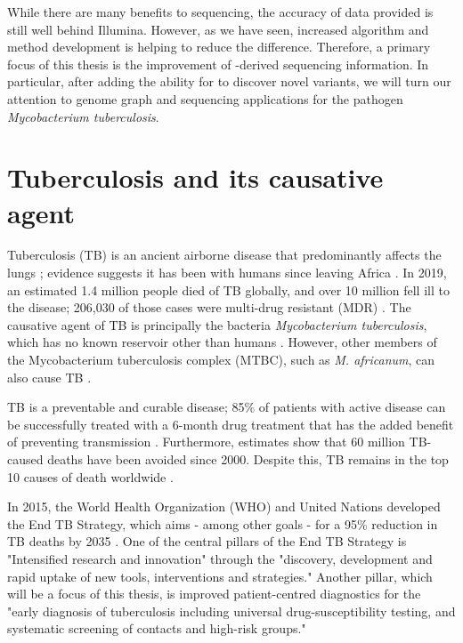 \hspace{0.75cm}

\noindent
While there are many benefits to \ont{} sequencing, the accuracy of data provided is still well behind Illumina. However, as we have seen, increased algorithm and method development is helping to reduce the difference. Therefore, a primary focus of this thesis is the improvement of \ont{}-derived sequencing information. In particular, after adding the ability for \pandora{} to discover novel variants, we will turn our attention to genome graph and \ont{} sequencing applications for the pathogen \textit{Mycobacterium tuberculosis}.

\section{Tuberculosis and its causative agent}
\label{sec:tb}

Tuberculosis (TB) is an ancient airborne disease that predominantly affects the lungs \cite{Pai2016}; evidence suggests it has been with humans since leaving Africa \cite{Wirth2008,Comas2013}. In 2019, an estimated 1.4 million people died of TB globally, and over 10 million fell ill to the disease; 206,030 of those cases were multi-drug resistant (MDR) \cite{who2020}. The causative agent of TB is principally the bacteria \textit{Mycobacterium tuberculosis}, which has no known reservoir other than humans \cite{Comas2013}. However, other members of the Mycobacterium tuberculosis complex (MTBC), such as \textit{M. africanum}, can also cause TB \cite{Pai2016}. 

TB is a preventable and curable disease; 85\% of patients with active disease can be successfully treated with a 6-month drug treatment that has the added benefit of preventing transmission \cite{who2020}. Furthermore, estimates show that 60 million TB-caused deaths have been avoided since 2000. Despite this, TB remains in the top 10 causes of death worldwide \cite{who2020}. 

In 2015, the World Health Organization (WHO) and United Nations developed the End TB Strategy, which aims - among other goals - for a 95\% reduction in TB deaths by 2035 \cite{endtb2020}. One of the central pillars of the End TB Strategy is "Intensified research and innovation" through the "discovery, development and rapid uptake of new tools, interventions and strategies." Another pillar, which will be a focus of this thesis, is improved patient-centred diagnostics for the "early diagnosis of tuberculosis including universal drug-susceptibility testing, and systematic screening of contacts and high-risk groups."

